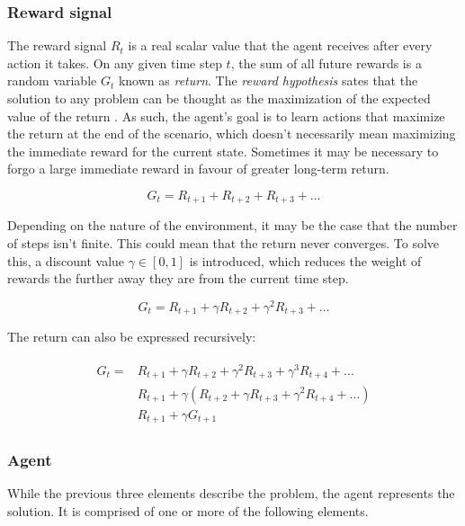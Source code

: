 \subsubsection{Reward signal}

The reward signal $R_t$ is a real scalar value that the agent receives after every action it takes. On any given time step $t$, the sum of all future rewards is a random variable $G_t$ known as \textit{return}. The \textit{reward hypothesis} sates that the solution to any problem can be thought as the maximization of the expected value of the return \cite{Sutton:2018}. As such, the agent's goal is to learn actions that maximize the return at the end of the scenario, which doesn't necessarily mean maximizing the immediate reward for the current state. Sometimes it may be necessary to forgo a large immediate reward in favour of greater long-term return.

\begin{equation}
    G_t = R_{t+1} + R_{t+2} + R_{t+3} + \ldots
\end{equation}

Depending on the nature of the environment, it may be the case that the number of steps isn't finite. This could mean that the return never converges. To solve this, a discount value $\gamma \in [0,1]$ is introduced, which reduces the weight of rewards the further away they are from the current time step.

\begin{equation}
    G_t = R_{t+1} + \gamma R_{t+2} + \gamma^2 R_{t+3} + \ldots
\end{equation}

The return can also be expressed recursively:

\begin{align}
\begin{split}
    G_t = &R_{t+1} + \gamma R_{t+2} + \gamma^2 R_{t+3}  + \gamma^3 R_{t+4} + \ldots\\
    &R_{t+1} + \gamma(R_{t+2} + \gamma R_{t+3} + \gamma^2 R_{t+4} + \ldots)\\
    &R_{t+1} + \gamma G_{t+1}
\end{split}
\end{align}

\subsubsection{Agent}

While the previous three elements describe the problem, the agent represents the solution. It is comprised of one or more of the following elements.

